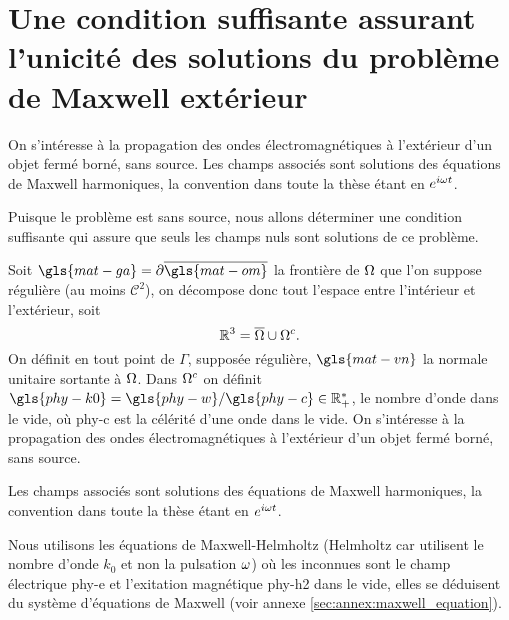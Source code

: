 \section{Une condition suffisante assurant l'unicité des solutions du problème de Maxwell extérieur}
  On s’intéresse à la propagation des ondes électromagnétiques à l'extérieur d'un objet fermé borné, sans source.
  Les champs associés sont solutions des équations de Maxwell harmoniques, la convention dans toute la thèse étant en \(e^{i\omega t}\). 


  Puisque le problème est sans source, nous allons déterminer une condition suffisante qui assure que seuls les champs nuls sont solutions de ce problème.


  Soit \(\gls{mat-ga}=\partial\overline{\gls{mat-om}}\) la frontière de \(\Omega\) que l'on suppose régulière (au moins \(\mathcal{C}^2\)), on décompose donc tout l'espace entre l'intérieur et l'extérieur, soit 
  \[
    \mathbb R^3 = \overline{\Omega}\cup{\Omega}^c.
  \]
  On définit en tout point de \(\Gamma\), supposée régulière, \(\gls{mat-vn}\) la normale unitaire sortante à \(\Omega\).
  Dans \(\Omega^c\) on définit \(\gls{phy-k0}=\gls{phy-w} / \gls{phy-c} \in \RR_+^*\), le nombre d'onde dans le vide, où \gls{phy-c} 
  est la célérité d'une onde dans le vide.
  On s’intéresse à la propagation des ondes électromagnétiques à l'extérieur d'un objet fermé borné, sans source.

  Les champs associés sont solutions des équations de Maxwell harmoniques, la convention dans toute la thèse étant en \(e^{i\omega t}\). 

  Nous utilisons les équations de Maxwell-Helmholtz (Helmholtz car utilisent le nombre d'onde \(k_0\) et non la pulsation \(\omega\)) où les inconnues sont le champ électrique \gls{phy-e} et l'exitation magnétique \gls{phy-h2} dans le vide, elles se déduisent du système d'équations de Maxwell (voir annexe \ref{sec:annex:maxwell_equation}). 

